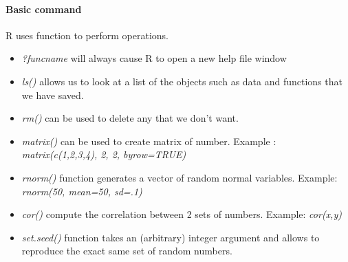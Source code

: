 \paragraph{Basic command}
R uses function to perform operations.\\
\begin{itemize}
  \item \emph{?funcname} will always cause R to open a new help file
    window
  \item \emph{ls()} allows us to look at a list of the objects such
    as data and functions that we have saved.
  \item \emph{rm()} can be used to delete any that we don't want.
  \item \emph{matrix()} can be used to create matrix of number. Example
  : \textit{matrix(c(1,2,3,4), 2, 2, byrow=TRUE)}
  \item \emph{rnorm()} function generates a vector of random normal
    variables. Example: \textit{rnorm(50, mean=50, sd=.1)}
  \item \emph{cor()} compute the correlation between 2 sets of numbers.
    Example: \textit{cor(x,y)}
  \item \emph{set.seed()} function takes an (arbitrary) integer 
    argument and allows to reproduce the exact same set of random
    numbers.
 \end{itemize}
